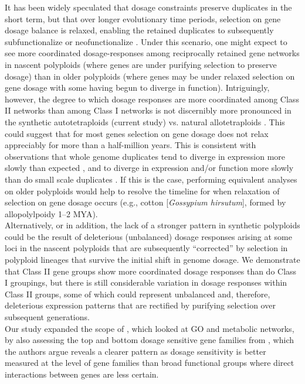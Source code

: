 \documentclass[11pt]{article}
\begin{document}
It has been widely speculated that dosage constraints preserve duplicates in the short term, but that over longer evolutionary time periods, selection on gene dosage balance is relaxed, enabling the retained duplicates to subsequently subfunctionalize or neofunctionalize \citep{coate2011, schnable2012, conant2014, coate2016}.
Under this scenario, one might expect to see more coordinated dosage-responses among reciprocally retained gene networks in nascent polyploids (where genes are under purifying selection to preserve dosage) than in older polyploids (where genes may be under relaxed selection on gene dosage with some having begun to diverge in function).
Intriguingly, however, the degree to which dosage responses are more coordinated among Class II networks than among Class I networks is not discernibly more pronounced in the synthetic autotetraploids (current study) vs. natural allotetraploids \citep{coate2016}.
This could suggest that for most genes selection on gene dosage does not relax appreciably for more than a half-million years.
This is consistent with observations that whole genome duplicates tend to diverge in expression more slowly than expected \citep{rodgers2012, tasdighian2017}, and to diverge in expression and/or function more slowly than do small scale duplicates \citep{hakes2007, qiao2018, wang2011, rodgers2012, defoort2019}.
If this is the case, performing equivalent analyses on older polyploids would help to resolve the timeline for when relaxation of selection on gene dosage occurs (e.g., cotton [\textit{Gossypium hirsutum}], formed by allopolylpoidy 1--2 MYA).\\

Alternatively, or in addition, the lack of a stronger pattern in synthetic polyploids could be the result of deleterious (unbalanced) dosage responses arising at some loci in the nascent polyploids that are subsequently ``corrected'' by selection in polyploid lineages that survive the initial shift in genome dosage.
We demonstrate that Class II gene groups show more coordinated dosage responses than do Class I groupings, but there is still considerable variation in dosage responses within Class II groups, some of which could represent unbalanced and, therefore, deleterious expression patterns that are rectified by purifying selection over subsequent generations.\\

Our study expanded the scope of \cite{coate2016}, which looked at GO and metabolic networks, by also assessing the top and bottom dosage sensitive gene families from \cite{tasdighian2017}, which the authors argue reveals a clearer pattern as dosage sensitivity is better measured at the level of gene families than broad functional groups where direct interactions between genes are less certain.\\
\end{document}
